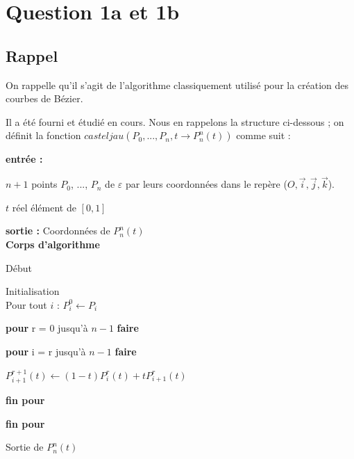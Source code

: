 \documentclass[a4paper,10pt]{report}
\begin{document}
\section*{Question 1a et 1b}

\subsection*{Rappel}

On rappelle qu'il s'agit de l'algorithme classiquement utilisé pour la création des courbes de Bézier.

Il a été fourni et étudié en cours. Nous en rappelons la structure ci-dessous ; 
on définit la fonction $casteljau(P_{0} , ..., P_{n}, t \rightarrow P_{n}^{n}(t))$ comme suit :

\textbf{entrée :}

\begin{list}{}{}
\item $n+1$ points $P_{0}$, ..., $P_{n}$ de $\varepsilon$ par leurs coordonnées dans le repère ($O, \vec{i}, \vec{j}, \vec{k}$).
\item $t$ réel élément de $[0, 1]$

\end{list}

\textbf{sortie :} Coordonnées de $P^{n}_{n}(t)$\\

\textbf{Corps d'algorithme}

Début
\begin{list}{}{}
\item Initialisation\\Pour tout $i$ : $P_{i}^{0} \leftarrow P_{i}$
\item \textbf{pour} r = 0 jusqu'à $n-1$ \textbf{faire}
\item \begin{list}{}{}
\item \textbf{pour} i = r jusqu'à $n-1$ \textbf{faire}
\item \begin{list}{}{}
\item $P^{r+1}_{i+1}(t) \leftarrow (1 - t)P^{r}_{i}(t) + tP^{r}_{i+1}(t)$
\end{list}
\item \textbf{fin pour}
\end{list}
\item \textbf{fin pour}
\item Sortie de $P^{n}_{n}(t)$
\end{list}
\end{document}
